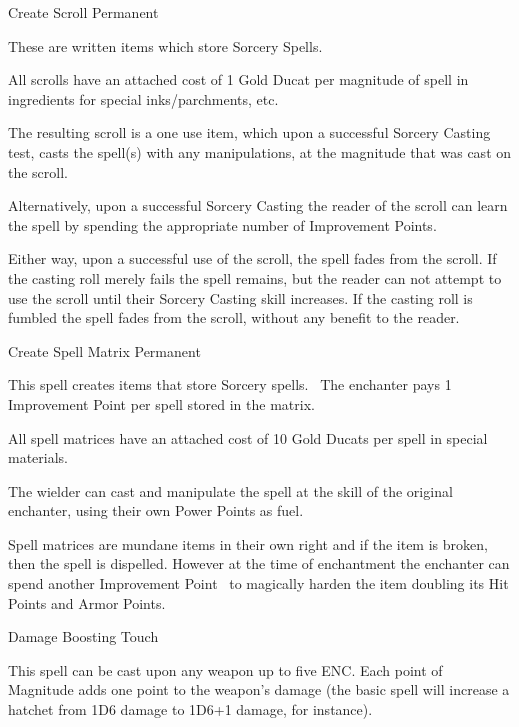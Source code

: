 \begin{samepage}
\begin{rpg-spell}
{Create Scroll}
{Permanent}

These are written items which store Sorcery Spells.

All scrolls have an attached cost of 1 Gold Ducat per magnitude of spell in ingredients for special inks/parchments, etc.

The resulting scroll is a one use item, which upon a successful Sorcery Casting test, casts the spell(s) with any manipulations, at the magnitude that was cast on the scroll.

Alternatively, upon a successful Sorcery Casting the reader of the scroll can learn the spell by spending the appropriate number of Improvement Points.

Either way, upon a successful use of the scroll, the spell fades from the scroll. If the casting roll merely fails the spell remains, but the reader can not attempt to use the scroll until their Sorcery Casting skill increases. If the casting roll is fumbled the spell fades from the scroll, without any benefit to the reader.
\end{rpg-spell}
\end{samepage}


\begin{samepage}
\begin{rpg-spell}
{Create Spell Matrix}
{Permanent}

This spell creates items that store Sorcery spells. 
The enchanter pays 1 Improvement Point per spell stored in the matrix.

All spell matrices have an attached cost of 10 Gold Ducats per spell in special materials.

The wielder can cast and manipulate the spell at the skill of the original enchanter, using their own Power Points as fuel.

Spell matrices are mundane items in their own right and if the item is broken, then the spell is dispelled. However at the time of enchantment the enchanter can spend another Improvement Point  to magically harden the item doubling its Hit Points and Armor Points.
\end{rpg-spell}
\end{samepage}

\begin{samepage}
\begin{rpg-spell}
{Damage Boosting}
{Touch}

This spell can be cast upon any weapon up to five ENC. Each point of Magnitude adds one point to the weapon’s damage (the basic spell will increase a hatchet from 1D6 damage to 1D6+1 damage, for instance). 
\end{rpg-spell}
\end{samepage}


